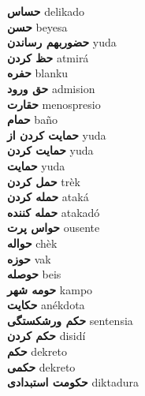 \textbf{ حساس  } delikado \\
\textbf{ حسن  } beyesa \\
\textbf{ حضوربهم رساندن  } yuda \\
\textbf{ حظ کردن  } atmirá \\
\textbf{ حفره  } blanku \\
\textbf{ حق ورود  } admision \\
\textbf{ حقارت  } menospresio \\
\textbf{ حمام  } baño \\
\textbf{ حمایت کردن از  } yuda \\
\textbf{ حمایت کردن  } yuda \\
\textbf{ حمایت  } yuda \\
\textbf{ حمل کردن  } trèk \\
\textbf{ حمله کردن  } ataká \\
\textbf{ حمله کننده  } atakadó \\
\textbf{ حواس پرت  } ousente \\
\textbf{ حواله  } chèk \\
\textbf{ حوزه  } vak \\
\textbf{ حوصله  } beis \\
\textbf{ حومه شهر  } kampo \\
\textbf{ حکایت  } anékdota \\
\textbf{ حکم ورشکستگی  } sentensia \\
\textbf{ حکم کردن  } disidí \\
\textbf{ حکم  } dekreto \\
\textbf{ حکمی  } dekreto \\
\textbf{ حکومت استبدادی  } diktadura \\
